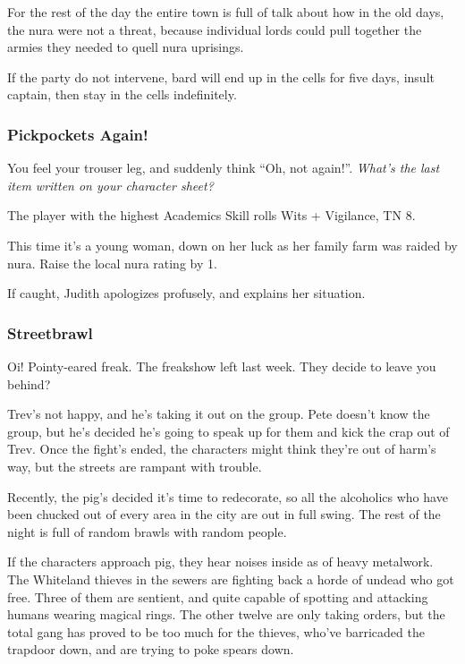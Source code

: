 For the rest of the day the entire town is full of talk about how in the old days, the nura were not a threat, because individual lords could pull together the armies they needed to quell nura uprisings.

If the party do not intervene, \gls{bard} will end up in the cells for five days, insult \gls{captain}, then stay in the cells indefinitely.

\subsubsection{Pickpockets Again!}
\begin{boxtext}
	You feel your trouser leg, and suddenly think ``Oh, not again!''.  \textit{What's the last item written on your character sheet?}
\end{boxtext}

The player with the highest Academics Skill rolls Wits + Vigilance, TN 8.

This time it's a young woman, down on her luck as her family farm was raided by nura.  Raise the local nura rating by 1.

If caught, Judith apologizes profusely, and explains her situation.


\humanthief

\subsubsection{Streetbrawl}
\begin{boxtext}
	Oi! Pointy-eared freak.  The freakshow left last week.  They decide to leave you behind?
\end{boxtext}

Trev's not happy, and he's taking it out on the group.  Pete doesn't know the group, but he's decided he's going to speak up for them and kick the crap out of Trev.  Once the fight's ended, the characters might think they're out of harm's way, but the streets are rampant with trouble.

Recently, the \gls{pig}'s decided it's time to redecorate, so all the alcoholics who have been chucked out of every area in the city are out in full swing.  The rest of the night is full of random brawls with random people.


\humanfarmer

If the characters approach \gls{pig}, they hear noises inside as of heavy metalwork.  The Whiteland thieves in the sewers are fighting back a horde of undead who got free.  Three of them are sentient, and quite capable of spotting and attacking humans wearing magical rings.  The other twelve are only taking orders, but the total gang has proved to be too much for the thieves, who've barricaded the trapdoor down, and are trying to poke spears down.

